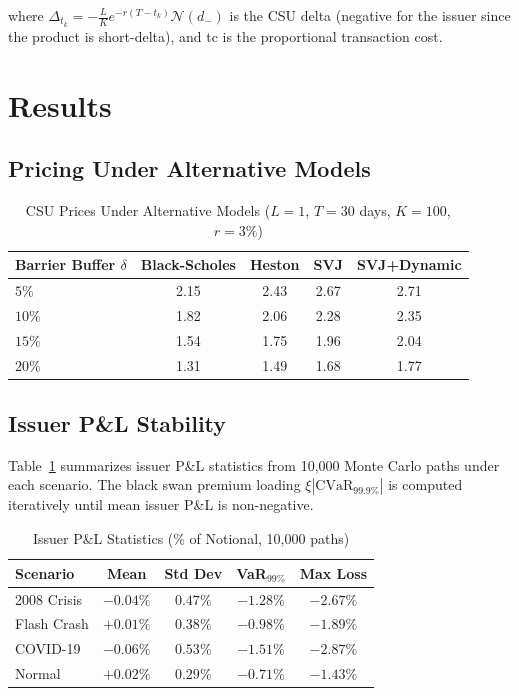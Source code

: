 \documentclass[12pt]{article}
\begin{document}
where $\Delta_{t_k} = -\frac{L}{K} e^{-r(T-t_k)} \mathcal{N}(d_-)$ is the CSU delta (negative
for the issuer since the product is short-delta), and tc is the proportional transaction cost.

\section{Results}\label{sec:results}

\subsection{Pricing Under Alternative Models}

\begin{table}[h]
\centering
\caption{CSU Prices Under Alternative Models ($L=1$, $T=30$ days, $K=100$, $r=3\%$)}
\begin{tabular}{lcccc}
\toprule
\textbf{Barrier Buffer $\delta$} & \textbf{Black-Scholes} & \textbf{Heston} & \textbf{SVJ} & \textbf{SVJ+Dynamic} \\
\midrule
$5\%$  & 2.15 & 2.43 & 2.67 & 2.71 \\
$10\%$ & 1.82 & 2.06 & 2.28 & 2.35 \\
$15\%$ & 1.54 & 1.75 & 1.96 & 2.04 \\
$20\%$ & 1.31 & 1.49 & 1.68 & 1.77 \\
\bottomrule
\end{tabular}
\end{table}

\subsection{Issuer P\&L Stability}

Table~\ref{tab:pnl} summarizes issuer P\&L statistics from 10,000 Monte Carlo paths under each
scenario. The black swan premium loading $\xi|\text{CVaR}_{99.9\%}|$ is computed iteratively until
mean issuer P\&L is non-negative.

\begin{table}[h]
\centering
\caption{Issuer P\&L Statistics (\% of Notional, 10,000 paths)}
\label{tab:pnl}
\begin{tabular}{lcccc}
\toprule
\textbf{Scenario} & \textbf{Mean} & \textbf{Std Dev} & \textbf{VaR$_{99\%}$} & \textbf{Max Loss} \\
\midrule
2008 Crisis  & $-0.04\%$ & $0.47\%$ & $-1.28\%$ & $-2.67\%$ \\
Flash Crash  & $+0.01\%$ & $0.38\%$ & $-0.98\%$ & $-1.89\%$ \\
COVID-19     & $-0.06\%$ & $0.53\%$ & $-1.51\%$ & $-2.87\%$ \\
Normal       & $+0.02\%$ & $0.29\%$ & $-0.71\%$ & $-1.43\%$ \\
\bottomrule
\end{tabular}
\end{table}
\end{document}
